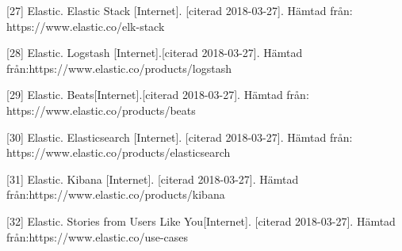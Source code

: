 \documentclass[12pt]{kththesis}
\begin{document}
[27] Elastic. Elastic Stack [Internet]. [citerad 2018-03-27]. Hämtad från:
https://www.elastic.co/elk-stack 

[28] Elastic. Logstash [Internet].[citerad 2018-03-27]. Hämtad från:\newline https://www.elastic.co/products/logstash

[29] Elastic. Beats[Internet].[citerad 2018-03-27]. Hämtad från: \newline https://www.elastic.co/products/beats

[30] Elastic. Elasticsearch [Internet]. [citerad 2018-03-27]. Hämtad från: https://www.elastic.co/products/elasticsearch

[31] Elastic. Kibana [Internet]. [citerad 2018-03-27]. Hämtad från:\newline  https://www.elastic.co/products/kibana 

[32] Elastic. Stories from Users Like You[Internet]. [citerad 2018-03-27]. Hämtad från:\newline https://www.elastic.co/use-cases

\afterpage{\null\newpage}
\end{document}
